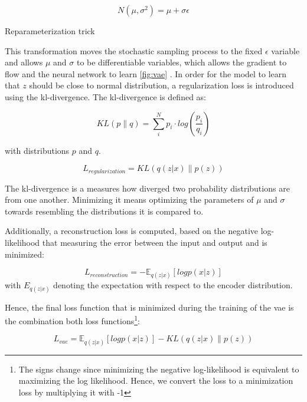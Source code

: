 \begin{equation}
  \label{eqn:reparameterization}
  N(\mu,\sigma^2) =\mu+\sigma\epsilon
\end{equation}
\caption[Reparameterization]{Reparameterization trick}

This transformation moves the stochastic sampling process to the fixed $\epsilon$ variable and allows $\mu$ and $\sigma$ to be differentiable variables, which allows the gradient to flow and the neural network to learn \autoref{fig:vae} \cite{kingma2013AutoEncodingVariationalBayes}.
In order for the model to learn that $z$ should be close to normal distribution, a regularization loss is introduced using the \gls{kl}-divergence.
The \gls{kl}-divergence is defined as:

\begin{equation}
    \label{eqn:kl-divergence}
    KL(p\parallel q) = \sum_{i}^{N}p_i\cdot log(\frac{p_i}{q_i})
\end{equation}

with distributions $p$ and $q$.


\begin{equation}
    \label{eqn:regularization_loss}
    L_{regularization} = KL(q(z|x) \parallel p(z))
\end{equation}

The \gls{kl}-divergence is a measures how diverged two probability distributions are from one another.
Minimizing it means optimizing the parameters of $\mu$ and $\sigma$ towards resembling the distributions it is compared to.

Additionally, a reconstruction loss is computed, based on the negative log-likelihood that measuring the error between the input and output and is minimized:

\begin{equation}
    \label{eqn:reconstruction_loss}
    L_{reconstruction} =-\mathbb{E}_{q(z|x)}[logp(x|z)]
\end{equation}
with $E_{q(z|x)}$ denoting the expectation with respect to the encoder distribution.

Hence, the final loss function that is minimized during the training of the \gls{vae} is the combination both loss functions\footnote{The signs change since minimizing the negative log-likelihood is equivalent to maximizing the log likelihood. Hence, we convert the loss to a minimization loss by multiplying it with -1}:

\begin{equation}
    \label{eqn:vae_loss}
    L_{vae} =\mathbb{E}_{q(z|x)}[logp(x|z)]-KL(q(z|x) \parallel p(z))
\end{equation}




